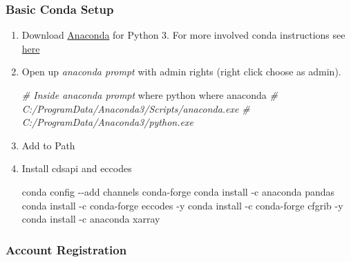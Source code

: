 \documentclass[
]{book}
\newenvironment{Shaded}{\begin{snugshade}}{\end{snugshade}}
\newcommand{\CommentTok}[1]{\textcolor[rgb]{0.56,0.35,0.01}{\textit{#1}}}
\newcommand{\ExtensionTok}[1]{#1}
\newcommand{\NormalTok}[1]{#1}
\begin{document}
\hypertarget{basic-conda-setup}{%
\subsubsection{Basic Conda Setup}\label{basic-conda-setup}}

\begin{enumerate}
\def\labelenumi{\arabic{enumi}.}
\item
  Download \href{https://www.anaconda.com/products/individual}{Anaconda} for Python 3. For more involved conda instructions see \href{https://fanwangecon.github.io/Tex4Econ/nontex/install/windows/fn_installations.html}{here}
\item
  Open up \emph{anaconda prompt} with admin rights (right click choose as admin).

\begin{Shaded}
\begin{Highlighting}[]
\CommentTok{\# Inside anaconda prompt}
\ExtensionTok{where}\NormalTok{ python}
\ExtensionTok{where}\NormalTok{ anaconda}
\CommentTok{\# C:/ProgramData/Anaconda3/Scripts/anaconda.exe}
\CommentTok{\# C:/ProgramData/Anaconda3/python.exe}
\end{Highlighting}
\end{Shaded}
\item
  Add to Path
\item
  Install cdsapi and eccodes

\begin{Shaded}
\begin{Highlighting}[]
\ExtensionTok{conda}\NormalTok{ config {-}{-}add channels conda{-}forge}
\ExtensionTok{conda}\NormalTok{ install {-}c anaconda pandas}
\ExtensionTok{conda}\NormalTok{ install {-}c conda{-}forge eccodes {-}y}
\ExtensionTok{conda}\NormalTok{ install {-}c conda{-}forge cfgrib {-}y}
\ExtensionTok{conda}\NormalTok{ install {-}c anaconda xarray}
\end{Highlighting}
\end{Shaded}
\end{enumerate}

\hypertarget{account-registration}{%
\subsubsection{Account Registration}\label{account-registration}}
\end{document}
